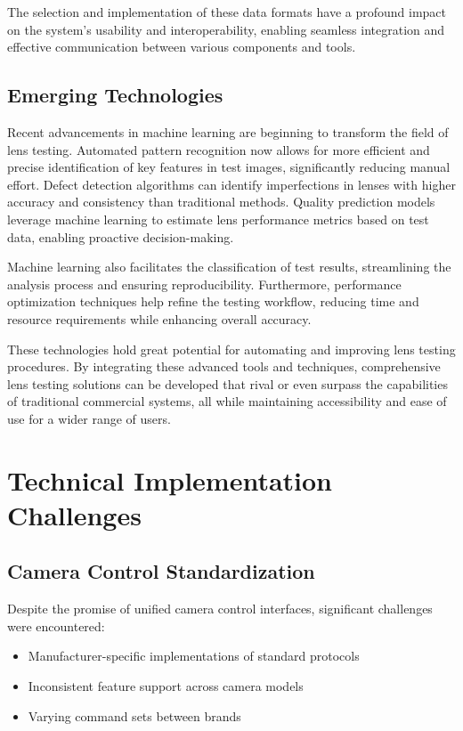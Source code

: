 The selection and implementation of these data formats have a profound impact on the system's usability and interoperability, enabling seamless integration and effective communication between various components and tools.

\subsection{Emerging Technologies}

Recent advancements in machine learning are beginning to transform the field of lens testing. Automated pattern recognition now allows for more efficient and precise identification of key features in test images, significantly reducing manual effort. Defect detection algorithms can identify imperfections in lenses with higher accuracy and consistency than traditional methods. Quality prediction models leverage machine learning to estimate lens performance metrics based on test data, enabling proactive decision-making.

Machine learning also facilitates the classification of test results, streamlining the analysis process and ensuring reproducibility. Furthermore, performance optimization techniques help refine the testing workflow, reducing time and resource requirements while enhancing overall accuracy.

These technologies hold great potential for automating and improving lens testing procedures. By integrating these advanced tools and techniques, comprehensive lens testing solutions can be developed that rival or even surpass the capabilities of traditional commercial systems, all while maintaining accessibility and ease of use for a wider range of users.

\section{Technical Implementation Challenges}

\subsection{Camera Control Standardization}
Despite the promise of unified camera control interfaces, significant challenges were encountered:
\begin{itemize}
    \item Manufacturer-specific implementations of standard protocols
    \item Inconsistent feature support across camera models
    \item Varying command sets between brands
\end{itemize}

